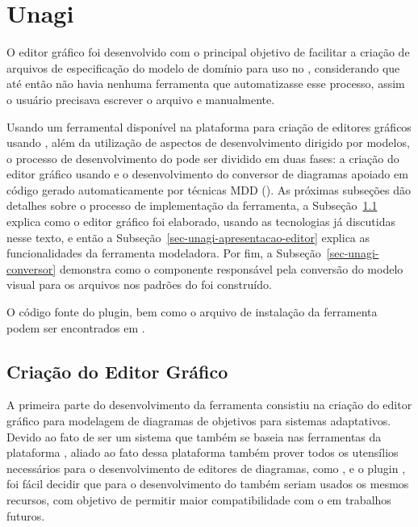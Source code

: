 \chapter{Unagi}
\label{sec-unagi}

O editor gráfico \unagi foi desenvolvido com o principal objetivo de facilitar a criação de arquivos de especificação do modelo de domínio para uso no \zanshin, considerando que até então não havia nenhuma ferramenta que automatizasse esse processo, assim o usuário precisava escrever o arquivo \xml e \ecore manualmente. 

Usando um ferramental disponível na plataforma \eclipse para criação de editores gráficos usando \emf, além da utilização de aspectos de desenvolvimento dirigido por modelos, o processo de desenvolvimento do \unagi pode ser dividido em duas fases: a criação do editor gráfico usando \sirius e o desenvolvimento do conversor de diagramas apoiado em código gerado automaticamente por técnicas MDD (\mdd). As próximas subseções dão detalhes sobre o processo de implementação da ferramenta, a Subseção~\ref{sec-unagi-criacao-editor} explica como o editor gráfico foi elaborado, usando as tecnologias já discutidas nesse texto, e então a Subseção~\ref{sec-unagi-apresentacao-editor} explica as funcionalidades da ferramenta modeladora. Por fim, a Subseção~\ref{sec-unagi-conversor} demonstra como o componente responsável pela conversão do modelo visual para os arquivos nos padrões do \zanshin foi construído.

O código fonte do plugin, bem como o arquivo de instalação da ferramenta podem ser encontrados em \codigoUnagi.
\section{Criação do Editor Gráfico}
\label{sec-unagi-criacao-editor}

A primeira parte do desenvolvimento da ferramenta consistiu  na criação do editor gráfico para modelagem de diagramas de objetivos para sistemas adaptativos. Devido ao fato de \zanshin ser um sistema que também se baseia nas ferramentas da plataforma \eclipse, aliado ao fato dessa plataforma também prover todos os utensílios necessários para o desenvolvimento de editores de diagramas, como \ecore, \emf e o plugin \sirius, foi fácil decidir que para o desenvolvimento do \unagi também seriam usados os mesmos recursos, com objetivo de permitir maior compatibilidade com o \zanshin em trabalhos futuros.

